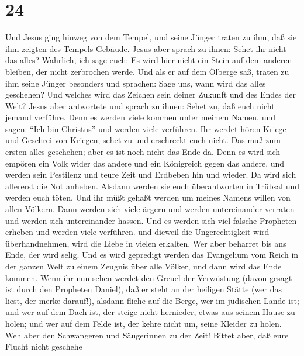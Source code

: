 \hypertarget{section-23}{%
\section{24}\label{section-23}}

 Und Jesus ging hinweg von dem Tempel, und seine Jünger
traten zu ihm, daß sie ihm zeigten des Tempels Gebäude. 
Jesus aber sprach zu ihnen: Sehet ihr nicht das alles? Wahrlich, ich
sage euch: Es wird hier nicht ein Stein auf dem anderen bleiben, der
nicht zerbrochen werde.  Und als er auf dem Ölberge saß,
traten zu ihm seine Jünger besonders und sprachen: Sage uns, wann wird
das alles geschehen? Und welches wird das Zeichen sein deiner Zukunft
und des Endes der Welt?  Jesus aber antwortete und sprach zu
ihnen: Sehet zu, daß euch nicht jemand verführe.  Denn es
werden viele kommen unter meinem Namen, und sagen: ``Ich bin Christus''
und werden viele verführen.  Ihr werdet hören Kriege und
Geschrei von Kriegen; sehet zu und erschreckt euch nicht. Das muß zum
ersten alles geschehen; aber es ist noch nicht das Ende da. 
Denn es wird sich empören ein Volk wider das andere und ein Königreich
gegen das andere, und werden sein Pestilenz und teure Zeit und Erdbeben
hin und wieder.  Da wird sich allererst die Not anheben.
 Alsdann werden sie euch überantworten in Trübsal und werden
euch töten. Und ihr müßt gehaßt werden um meines Namens willen von allen
Völkern.  Dann werden sich viele ärgern und werden
untereinander verraten und werden sich untereinander hassen.
 Und es werden sich viel falsche Propheten erheben und
werden viele verführen.  und dieweil die Ungerechtigkeit
wird überhandnehmen, wird die Liebe in vielen erkalten. 
Wer aber beharret bis ans Ende, der wird selig.  Und es
wird gepredigt werden das Evangelium vom Reich in der ganzen Welt zu
einem Zeugnis über alle Völker, und dann wird das Ende kommen.
 Wenn ihr nun sehen werdet den Greuel der Verwüstung (davon
gesagt ist durch den Propheten Daniel), daß er steht an der heiligen
Stätte (wer das liest, der merke darauf!),  alsdann fliehe
auf die Berge, wer im jüdischen Lande ist;  und wer auf dem
Dach ist, der steige nicht hernieder, etwas aus seinem Hause zu holen;
 und wer auf dem Felde ist, der kehre nicht um, seine
Kleider zu holen.  Weh aber den Schwangeren und Säugerinnen
zu der Zeit!  Bittet aber, daß eure Flucht nicht geschehe
